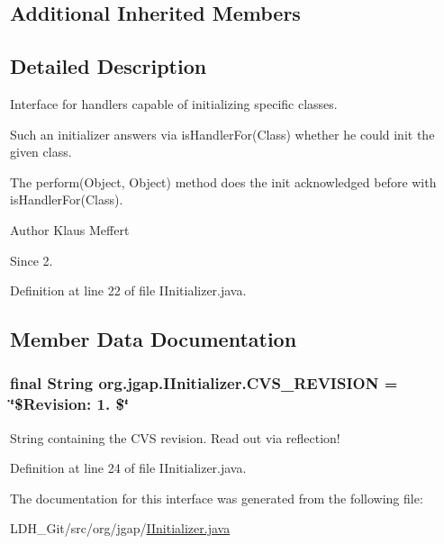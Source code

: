 \subsection*{Additional Inherited Members}


\subsection{Detailed Description}
Interface for handlers capable of initializing specific classes.

Such an initializer answers via is\-Handler\-For(\-Class) whether he could init the given class.

The perform(\-Object, Object) method does the init acknowledged before with is\-Handler\-For(\-Class).

\begin{DoxyAuthor}{Author}
Klaus Meffert 
\end{DoxyAuthor}
\begin{DoxySince}{Since}
2. 
\end{DoxySince}


Definition at line 22 of file I\-Initializer.\-java.



\subsection{Member Data Documentation}
\hypertarget{interfaceorg_1_1jgap_1_1_i_initializer_af84c0edbc3fdf99bda88da8d4ed1d2ea}{
\subsubsection[{C\-V\-S\-\_\-\-R\-E\-V\-I\-S\-I\-O\-N}]{\setlength{\rightskip}{0pt plus 5cm}final String org.\-jgap.\-I\-Initializer.\-C\-V\-S\-\_\-\-R\-E\-V\-I\-S\-I\-O\-N = \char`\"{}\$Revision\-: 1. \$\char`\"{}\hspace{0.3cm}{\ttfamily [static]}}}\label{interfaceorg_1_1jgap_1_1_i_initializer_af84c0edbc3fdf99bda88da8d4ed1d2ea}
String containing the C\-V\-S revision. Read out via reflection! 

Definition at line 24 of file I\-Initializer.\-java.



The documentation for this interface was generated from the following file\-:\begin{DoxyCompactItemize}
\item 
L\-D\-H\-\_\-\-Git/src/org/jgap/\hyperlink{_i_initializer_8java}{I\-Initializer.\-java}\end{DoxyCompactItemize}
